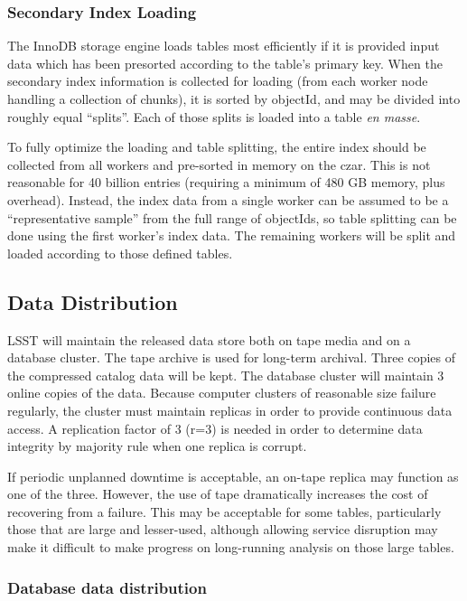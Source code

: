 \documentclass[DM,lsstdraft,toc]{lsstdoc}
\begin{document}
\subsubsection{Secondary Index Loading}\label{secondary-index-loading}

The InnoDB storage engine loads tables most efficiently if it is
provided input data which has been presorted according to the table's
primary key. When the secondary index information is collected for
loading (from each worker node handling a collection of chunks), it is
sorted by objectId, and may be divided into roughly equal ``splits''.
Each of those splits is loaded into a table \emph{en masse}.

To fully optimize the loading and table splitting, the entire index
should be collected from all workers and pre-sorted in memory on the
czar. This is not reasonable for 40 billion entries (requiring a minimum
of 480 GB memory, plus overhead). Instead, the index data from a single
worker can be assumed to be a ``representative sample'' from the full
range of objectIds, so table splitting can be done using the first
worker's index data. The remaining workers will be split and loaded
according to those defined tables.

\subsection{Data Distribution}\label{data-distribution}

LSST will maintain the released data store both on tape media and on a
database cluster. The tape archive is used for long-term archival. Three
copies of the compressed catalog data will be kept. The database cluster
will maintain 3 online copies of the data. Because computer clusters of
reasonable size failure regularly, the cluster must maintain replicas in
order to provide continuous data access. A replication factor of 3 (r=3)
is needed in order to determine data integrity by majority rule when one
replica is corrupt.

If periodic unplanned downtime is acceptable, an on-tape replica may
function as one of the three. However, the use of tape dramatically
increases the cost of recovering from a failure. This may be acceptable
for some tables, particularly those that are large and lesser-used,
although allowing service disruption may make it difficult to make
progress on long-running analysis on those large tables.

\subsubsection{Database data
distribution}\label{database-data-distribution}
\end{document}
